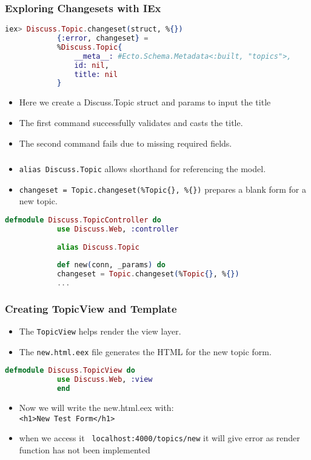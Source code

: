 \documentclass[aspectratio=169, table]{beamer}
\begin{document}
	\begin{frame}[fragile]
		\frametitle{Exploring Changesets with IEx}
		\begin{lstlisting}[language=Elixir]
			iex> Discuss.Topic.changeset(struct, %{})
			{:error, changeset} = 
			%Discuss.Topic{
				__meta__: #Ecto.Schema.Metadata<:built, "topics">,
				id: nil,
				title: nil
			}
		\end{lstlisting}
		\begin{itemize}
			\item Here we create a Discuss.Topic struct and params to input the title
			\item The first command successfully validates and casts the title.
			\item The second command fails due to missing required fields.
		\end{itemize}
	\end{frame}
	
	\begin{frame}[fragile]
		\frametitle{}
		\begin{itemize}
			\item \texttt{alias Discuss.Topic} allows shorthand for referencing the model.
			\item \texttt{changeset = Topic.changeset(\%Topic\{\}, \%\{\})} prepares a blank form for a new topic.
		\end{itemize}
		\begin{lstlisting}[language=Elixir]
			defmodule Discuss.TopicController do
			use Discuss.Web, :controller
			
			alias Discuss.Topic
			
			def new(conn, _params) do
			changeset = Topic.changeset(%Topic{}, %{})
			...
		\end{lstlisting}
	\end{frame}
	
	\begin{frame}[fragile]
		\frametitle{Creating TopicView and Template}
		\begin{itemize}
			\item The \texttt{TopicView} helps render the view layer.
			\item The \texttt{new.html.eex} file generates the HTML for the new topic form.
		\end{itemize}
		\begin{lstlisting}[language=Elixir]
			defmodule Discuss.TopicView do
			use Discuss.Web, :view
			end
		\end{lstlisting}
		\begin{itemize}
			\item {Now we will write the new.html.eex with:\\}
			\texttt{<h1>New Test Form</h1>}
			\item when we access it \texttt{ localhost:4000/topics/new} it will give error as render function has not been implemented
		\end{itemize}
	\end{frame}
	
\end{document}
